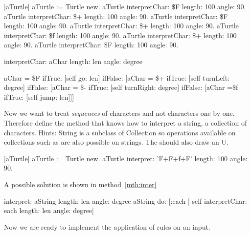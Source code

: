 \begin{scriptwithouttitle}\label{scr:anU}
|aTurtle|
aTurtle := Turtle new.
aTurtle interpretChar: \$F length: 100 angle: 90.
aTurtle interpretChar: \$+ length: 100 angle: 90.
aTurtle interpretChar: \$F length: 100 angle: 90.
aTurtle interpretChar: \$+ length: 100 angle: 90.
aTurtle interpretChar: \$f length: 100 angle: 90.
aTurtle interpretChar: \$+ length: 100 angle: 90.
aTurtle interpretChar: \$F length: 100 angle: 90.
\end{scriptwithouttitle}




\begin{method}\label{mth:interpretSymb}
interpretChar: aChar length: len angle: degree 
      
   aChar = \$F
      ifTrue: [self go: len]
      ifFalse: [aChar = \$+
                    ifTrue: [self turnLeft: degree]
                    ifFalse: [aChar = \$- 
                                  ifTrue: [self turnRight: degree]
                                  ifFalse: [aChar =\$f
                                               ifTrue: [self jump: len]]]
\end{method}




Now we want to treat \emph{sequences} of characters and not characters one by one. Therefore define the method  that knows how to interpret a string, \ie a collection of characters. Hints: String is a subclass of Collection so operations available on collections such as  are also possible on strings. The  should also draw an U.
\begin{scriptwithouttitle}\label{scr:anUM}
|aTurtle|
aTurtle := Turtle new.
aTurtle interpret: 'F+F+f+F' length: 100 angle: 90.
\end{scriptwithouttitle}

A possible solution is shown in method~\ref{mth:inter}

\begin{method}\label{mth:inter}
interpret: aString length: len angle: degree
    aString do: [:each | self interpretChar: each length: len angle: degree]
\end{method}

Now we are ready to implement the application of rules on an input. 

